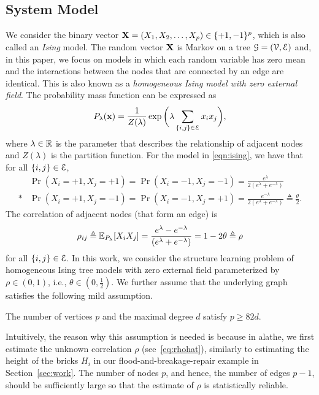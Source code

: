 \subsection{System Model}
We consider the binary vector $\mathbf{X}=(X_{1},X_2,\ldots, X_p)\in\{+1,-1\}^p$, which is also called an \emph{Ising} model. The random vector $\mathbf{X}$ is Markov on a tree $\mathcal{G}=(\mathcal{V},\mathcal{E})$ and, in this paper, we focus on models in which each random variable has zero mean and the interactions between the nodes that are connected by an edge are   identical. This is also known as a {\em homogeneous Ising model   with zero external field}\cite{daskalakis2019testing,tandon2021sga}. The probability mass function can be expressed as
\begin{align}
	P_\lambda(\mathbf{x})=\frac{1}{Z(\lambda)}\exp\bigg(\lambda\sum_{ \{i,j\}\in\mathcal{E}} x_{i}x_{j}\bigg), \label{eqn:ising}
\end{align}
where $\lambda\in\mathbb{R}$ is the parameter that describes the relationship  of adjacent nodes and $Z(\lambda)$ is the partition function. For the model in \eqref{eqn:ising}, we have that for all $\{i,j\}\in\mathcal{E}$, 
\begin{align}
	&\Pr(X_{i}=+1,X_{j}=+1)=\Pr(X_{i}=-1,X_{j}=-1)=\frac{e^{\lambda}}{2(e^{\lambda}+e^{-\lambda})}\nonumber\\*
	&\Pr(X_{i}=+1,X_{j}=-1)=\Pr(X_{i}=-1,X_{j}=+1)=\frac{e^{-\lambda}}{2(e^{\lambda}+e^{-\lambda})}\triangleq\frac{\theta}{2}.
\end{align}
The correlation of adjacent nodes  (that form an edge)
is
\begin{equation}
\rho_{ij}\triangleq\mathbb{E}_{P_\lambda}[X_{i}X_{j}]=\frac{e^{\lambda}-e^{-\lambda}}{(e^{\lambda}+e^{-\lambda})}=1-2\theta\triangleq\rho    
\end{equation}
 for all $\{i,j\}\in\mathcal{E}$. In this work, we consider the structure learning problem of homogeneous Ising tree models with zero external field parameterized by $\rho\in(0,1)$, i.e., $\theta\in(0,\frac{1}{2})$. We further assume that the underlying graph satisfies the 
following mild assumption.
\begin{assumption}\label{assump:smalldeg}
	The number of vertices $p$ and the maximal degree $d$ satisfy $p\geq 82d$.
\end{assumption}
Intuitively, the reason why this assumption is needed is because in \ac{alathe}, we first estimate the unknown correlation $\rho$ (see~\eqref{eq:rhohat}), similarly to estimating the height of the bricks  $H_i$ in  our  flood-and-breakage-repair example in Section~\ref{sec:work}. The number of nodes $p$, and hence, the number of edges $p-1$, should be sufficiently large so that the estimate of $\rho$  is statistically reliable.

